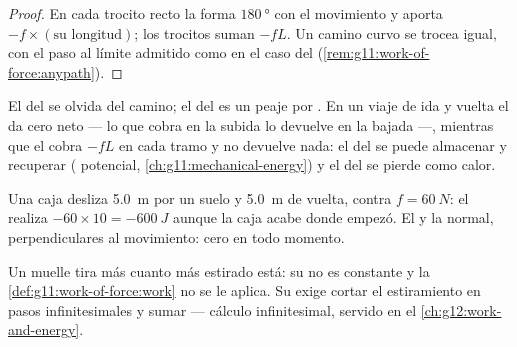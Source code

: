 \begin{proof}
En cada trocito recto la  forma $\qty{180}{\degree}$ con el
movimiento y aporta $-f \times (\text{su longitud})$; los trocitos suman
$-fL$. Un camino curvo se trocea igual, con el paso al límite admitido
como en el caso del  (\cref{rem:g11:work-of-force:anypath}).
\end{proof}

\begin{remark}\label{rem:g11:work-of-force:divide}
El  del  se olvida del camino; el del  es un peaje
por . En un viaje de ida y vuelta el  da cero neto --- lo que
cobra en la subida lo devuelve en la bajada ---, mientras que el
 cobra $-fL$ en cada tramo y no devuelve nada: el  del
 se puede almacenar y recuperar ( potencial,
\cref{ch:g11:mechanical-energy}) y el del  se pierde como
calor.
\end{remark}

\begin{example}\label{ex:g11:work-of-force:roundtrip}
Una caja desliza \qty{5.0}{m} por un suelo y \qty{5.0}{m} de vuelta,
contra $f = \qty{60}{N}$: el  realiza
$-60 \times 10 = \qty{-600}{J}$ aunque la caja acabe donde empezó. El
 y la  normal, perpendiculares al movimiento: cero en todo
momento.
\end{example}

\begin{remark}[¿Y un muelle?]\label{rem:g11:work-of-force:spring}
Un muelle tira más cuanto más estirado está: su  no es constante y
la \cref{def:g11:work-of-force:work} no se le aplica. Su  exige
cortar el estiramiento en pasos infinitesimales y sumar --- cálculo
infinitesimal, servido en el \cref{ch:g12:work-and-energy}.
\end{remark}

